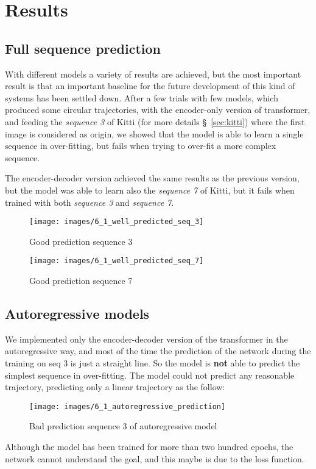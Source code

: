 \section{Results}\label{sec:results}


\subsection{Full sequence prediction}\label{subsec:full-sequence-prediction}
With different models a variety of results are achieved, but the most important result is that an important baseline for the future development of this kind of systems has been settled down.
After a few trials with few models, which produced some circular trajectories, with the encoder-only version of transformer, and feeding the \textit{sequence 3} of Kitti (for more details \S~\ref{sec:kitti}) where the first image is considered as origin, we showed that the model is able to learn a single sequence in over-fitting, but fails when trying to over-fit a more complex sequence.

The encoder-decoder version achieved the same results as the previous version, but the model was able to learn also the \textit{sequence 7} of Kitti, but it fails when trained with both \textit{sequence 3} and \textit{sequence 7}.
\begin{figure}[H]
    \centering
    \texttt{[image: images/6\_1\_well\_predicted\_seq\_3]}
    \caption{Good prediction sequence 3}\label{fig:well-predicted-seq-3}
\end{figure}
\begin{figure}[H]
    \centering
    \texttt{[image: images/6\_1\_well\_predicted\_seq\_7]}
    \caption{Good prediction sequence 7}\label{fig:well-predicted-seq-7}
\end{figure}

\subsection{Autoregressive models}\label{subsec:autoregressive-model}
We implemented only the encoder-decoder version of the transformer in the autoregressive way, and most of the time the prediction of the network during the training on seq 3 is just a straight line.
So the model is \textbf{not} able to predict the simplest sequence in over-fitting.
The model could not predict any reasonable trajectory, predicting only a linear trajectory as the follow:
\begin{figure}[H]
    \centering
    \texttt{[image: images/6\_1\_autoregressive\_prediction]}
    \caption{Bad prediction sequence 3 of autoregressive model}\label{fig:autoregressive-seq-3}
\end{figure}
Although the model has been trained for more than two hundred epochs, the network cannot understand the goal, and this maybe is due to the loss function.